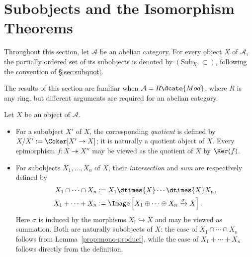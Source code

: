 
\section{Subobjects and the Isomorphism Theorems}\label{sec:Abel-cat-subobjects}
\hypertarget{o014.aljabr2.chapter2.subobjects-and-isomorphism-theorems}{ }

Throughout this section, let $\mathcal{A}$ be an abelian category. For every
object $X$ of $\mathcal{A}$, the partially ordered set of its subobjects is
denoted by $(\mathrm{Sub}_X,\subset)$, following the convention of
\S\ref{sec:subquot}.

The results of this section are familiar when $\mathcal{A}=R\dcate{Mod}$,
where $R$ is any ring, but different arguments are required for an abelian
category.

\begin{definition}\label{def:intersection-sum}
	Let $X$ be an object of $\mathcal{A}$.
	\begin{itemize}
		\item For a subobject $X'$ of $X$, the corresponding \emph{quotient}
		is defined by $X/X':=\Coker[X'\to X]$; it is naturally a quotient
		object of $X$. Every epimorphism $f:X\twoheadrightarrow X''$ may be
		viewed as the quotient of $X$ by $\Ker(f)$.
		\item For subobjects $X_1,\ldots,X_n$ of $X$, their \emph{intersection}
		and \emph{sum} are respectively defined by
		\begin{align*}
			X_1 \cap \cdots \cap X_n & := X_1 \dtimes{X} \cdots \dtimes{X} X_n, \\
			X_1 + \cdots + X_n & := \Image\left[ X_1 \oplus \cdots \oplus X_n \xrightarrow{\sigma} X \right].
		\end{align*}
		Here $\sigma$ is induced by the morphisms $X_i\hookrightarrow X$ and may
		be viewed as summation. Both are naturally subobjects of $X$: the case
		of $X_1\cap\cdots\cap X_n$ follows from
		Lemma~\ref{prop:mono-product}, while the case of
		$X_1+\cdots+X_n$ follows directly from the definition.
	\end{itemize}
\end{definition}

